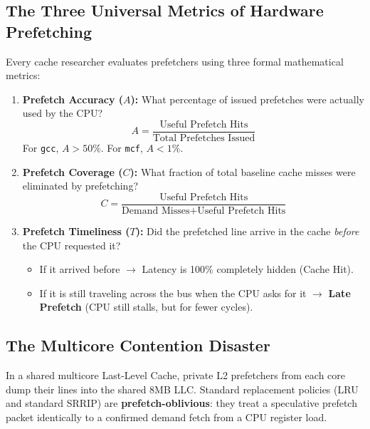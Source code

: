 \documentclass[11pt, a4paper]{article}
\begin{document}
\subsection{The Three Universal Metrics of Hardware Prefetching}
Every cache researcher evaluates prefetchers using three formal mathematical metrics:
\begin{enumerate}[leftmargin=1.5em]
  \item \textbf{Prefetch Accuracy ($A$):}
  What percentage of issued prefetches were actually used by the CPU?
  \begin{equation}
    A = \frac{\text{Useful Prefetch Hits}}{\text{Total Prefetches Issued}}
  \end{equation}
  For \texttt{gcc}, $A > 50\%$. For \texttt{mcf}, $A < 1\%$.

  \item \textbf{Prefetch Coverage ($C$):}
  What fraction of total baseline cache misses were eliminated by prefetching?
  \begin{equation}
    C = \frac{\text{Useful Prefetch Hits}}{\text{Demand Misses} + \text{Useful Prefetch Hits}}
  \end{equation}

  \item \textbf{Prefetch Timeliness ($T$):}
  Did the prefetched line arrive in the cache \textit{before} the CPU requested it?
  \begin{itemize}
    \item If it arrived before $\rightarrow$ Latency is 100\% completely hidden (Cache Hit).
    \item If it is still traveling across the bus when the CPU asks for it $\rightarrow$ \textbf{Late Prefetch} (CPU still stalls, but for fewer cycles).
  \end{itemize}
\end{enumerate}

\subsection{The Multicore Contention Disaster}
In a shared multicore Last-Level Cache, private L2 prefetchers from each core dump their lines into the shared 8MB LLC. Standard replacement policies (LRU and standard SRRIP) are \textbf{prefetch-oblivious}: they treat a speculative prefetch packet identically to a confirmed demand fetch from a CPU register load.
\end{document}

